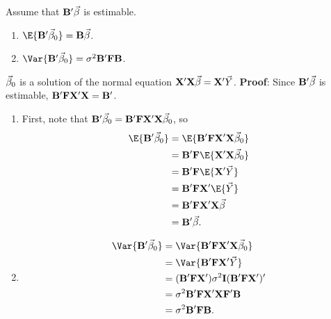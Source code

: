 \begin{Theorem}{}{}
    Assume that $ \mathbf{B}'\vec{\beta} $ is estimable.
    \begin{enumerate}[(1)]
        \item $ \E{\Matrix{B}'\Vector{\beta}_0}=\Matrix{B}\Vector{\beta} $.
        \item $ \Var{\Matrix{B}'\Vector{\beta}_0}=\sigma^2 \Matrix{B}'\Matrix{F}\Matrix{B} $.
    \end{enumerate}
    $ \vec{\beta}_0 $ is a solution of the normal equation
    $ \mathbf{X}'\mathbf{X}\vec{\beta}=\mathbf{X}'\vec{Y} $.
    \tcblower{}
    \textbf{Proof}:
    Since $ \mathbf{B}'\vec{\beta} $ is estimable, $ \mathbf{B}'\mathbf{F}\mathbf{X}'\mathbf{X}=\mathbf{B}' $.
    \begin{enumerate}[(1)]
        \item First, note that $ \mathbf{B}'\vec{\beta}_0=\mathbf{B}'\mathbf{F}\mathbf{X}'\mathbf{X}\vec{\beta}_0 $, so
              \begin{align*}
                  \E{\Matrix{B}'\Vector{\beta}_0}
                   & =\E{\Matrix{B}'\Matrix{F}\Matrix{X}'\Matrix{X}\Vector{\beta}_0} \\
                   & =\Matrix{B}'\Matrix{F}\E{\Matrix{X}'\Matrix{X}\Vector{\beta}_0} \\
                   & =\Matrix{B}'\Matrix{F}\E{\Matrix{X}'\Vector{Y}}                 \\
                   & =\Matrix{B}'\Matrix{F}\Matrix{X}'\E{\Vector{Y}}                 \\
                   & =\Matrix{B}'\Matrix{F}\Matrix{X}'\Matrix{X}\Vector{\beta}       \\
                   & =\Matrix{B}'\Vector{\beta}.
              \end{align*}
        \item \begin{align*}
                  \Var{\Matrix{B}'\Vector{\beta}_0}
                   & =\Var{\Matrix{B}'\Matrix{F}\Matrix{X}'\Matrix{X}\Vector{\beta}_0}                         \\
                   & =\Var{\Matrix{B}'\Matrix{F}\Matrix{X}'\Vector{Y}}                                         \\
                   & =(\Matrix{B}'\Matrix{F}\Matrix{X}')\sigma^2 \Matrix{I}(\Matrix{B}'\Matrix{F}\Matrix{X}')' \\
                   & =\sigma^2 \Matrix{B}'\Matrix{F}\Matrix{X}'\Matrix{X}\Matrix{F}'\Matrix{B}                 \\
                   & =\sigma^2 \Matrix{B}'\Matrix{F}\Matrix{B}.
              \end{align*}
    \end{enumerate}
\end{Theorem}
